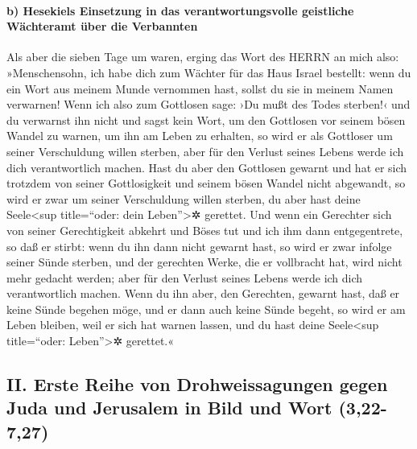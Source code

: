 \hypertarget{b-hesekiels-einsetzung-in-das-verantwortungsvolle-geistliche-wuxe4chteramt-uxfcber-die-verbannten}{%
\paragraph{b) Hesekiels Einsetzung in das verantwortungsvolle geistliche
Wächteramt über die
Verbannten}\label{b-hesekiels-einsetzung-in-das-verantwortungsvolle-geistliche-wuxe4chteramt-uxfcber-die-verbannten}}

Als aber die sieben Tage um waren, erging das Wort des
HERRN an mich also: »Menschensohn, ich habe dich zum
Wächter für das Haus Israel bestellt: wenn du ein Wort aus meinem Munde
vernommen hast, sollst du sie in meinem Namen verwarnen!
Wenn ich also zum Gottlosen sage: ›Du mußt des Todes
sterben!‹ und du verwarnst ihn nicht und sagst kein Wort, um den
Gottlosen vor seinem bösen Wandel zu warnen, um ihn am Leben zu
erhalten, so wird er als Gottloser um seiner Verschuldung willen
sterben, aber für den Verlust seines Lebens werde ich dich
verantwortlich machen. Hast du aber den Gottlosen gewarnt
und hat er sich trotzdem von seiner Gottlosigkeit und seinem bösen
Wandel nicht abgewandt, so wird er zwar um seiner Verschuldung willen
sterben, du aber hast deine Seele\textless sup title=``oder: dein
Leben''\textgreater✲ gerettet. Und wenn ein Gerechter
sich von seiner Gerechtigkeit abkehrt und Böses tut und ich ihm dann
entgegentrete, so daß er stirbt: wenn du ihn dann nicht gewarnt hast, so
wird er zwar infolge seiner Sünde sterben, und der gerechten Werke, die
er vollbracht hat, wird nicht mehr gedacht werden; aber für den Verlust
seines Lebens werde ich dich verantwortlich machen. Wenn
du ihn aber, den Gerechten, gewarnt hast, daß er keine Sünde begehen
möge, und er dann auch keine Sünde begeht, so wird er am Leben bleiben,
weil er sich hat warnen lassen, und du hast deine Seele\textless sup
title=``oder: Leben''\textgreater✲ gerettet.«

\hypertarget{ii.-erste-reihe-von-drohweissagungen-gegen-juda-und-jerusalem-in-bild-und-wort-322-727}{%
\subsection{II. Erste Reihe von Drohweissagungen gegen Juda und
Jerusalem in Bild und Wort
(3,22-7,27)}\label{ii.-erste-reihe-von-drohweissagungen-gegen-juda-und-jerusalem-in-bild-und-wort-322-727}}


